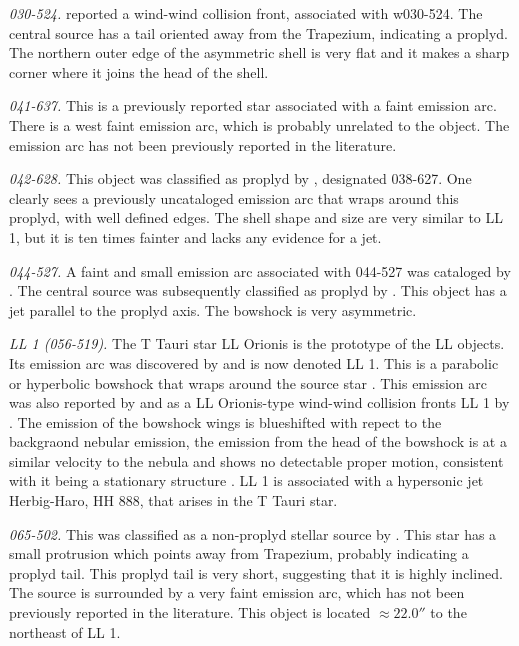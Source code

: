 \documentclass[iop, apj]{emulateapj}
\begin{document}
\textit{030-524.} \citet{Bally:2000a} reported a wind-wind collision front, associated with w030-524. The central source has a tail oriented away from the Trapezium, indicating a proplyd. The northern outer edge of the asymmetric shell is very flat and it makes a sharp corner where it joins the head of the shell.

\textit{041-637.} This is a previously reported star \citep{Da-Rio:2009a} associated with a faint emission arc. There is a west faint emission arc, which is probably unrelated to the object. The emission arc has not been previously reported in the literature.

\textit{042-628.} This object was classified as proplyd by \citet{Ricci:2008a}, designated 038-627. One clearly sees a previously uncataloged emission arc that wraps around this proplyd, with well defined edges. The shell shape and size are very similar to LL 1, but it is ten times fainter and lacks any evidence for a jet.    

\textit{044-527.} A faint and small emission arc associated with 044-527 was cataloged by \citet{Bally:2000a}. The central source was subsequently classified as proplyd by \citet{Ricci:2008a}. This object has a jet parallel to the proplyd axis. The bowshock is very asymmetric.

\textit{LL 1 (056-519).} The T Tauri star LL Orionis is the prototype of the LL objects. Its emission arc was discovered by \citet{Gull:1979a} and is now denoted LL 1. This is a parabolic or hyperbolic bowshock that wraps around the source star \citep{Bally:2006a}. This emission arc was also reported by \citet{Bally:2000a} and as a LL Orionis-type wind-wind collision fronts LL 1 by \citet{Bally:2001a}. The emission of the bowshock wings is blueshifted with repect to the backgraond nebular emission, the emission from the head of the bowshock is at a similar velocity to the nebula and shows no detectable proper motion, consistent with it being a stationary structure \citep{Henney:2013a}. LL 1 is associated with a hypersonic jet Herbig-Haro, HH 888, that arises in the T Tauri star.

\textit{065-502.} This was classified as a  non-proplyd stellar source by \citet{ODell:1996a}. This star has a small protrusion which points away from Trapezium, probably indicating a proplyd tail. This proplyd tail is very short, suggesting that it is highly inclined. The source is surrounded by a very faint emission arc, which has not been previously reported in the literature. This object is located \(\approx 22.0''\) to the northeast of LL 1.    
\end{document}
